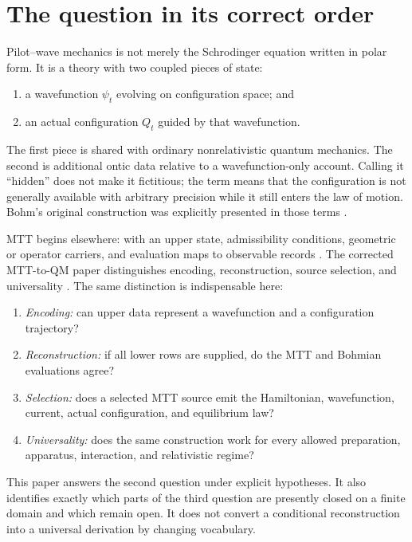 \documentclass[11pt]{article}
\theoremstyle{definition}
\theoremstyle{remark}
\let\MTToriginalitem\item
\renewcommand{\item}{\par\MTToriginalitem}
\begin{document}
\tableofcontents

\section{The question in its correct order}
\label{sec:question}

Pilot--wave mechanics is not merely the Schrodinger equation written in
polar form.  It is a theory with two coupled pieces of state:
\begin{enumerate}[leftmargin=2em]
\item a wavefunction \(\psi_t\) evolving on configuration space; and
\item an actual configuration \(Q_t\) guided by that wavefunction.
\end{enumerate}
The first piece is shared with ordinary nonrelativistic quantum mechanics.
The second is additional ontic data relative to a wavefunction-only account.
Calling it ``hidden'' does not make it fictitious; the term means that the
configuration is not generally available with arbitrary precision while it
still enters the law of motion.  Bohm's original construction was explicitly
presented in those terms \cite{Bohm1952I,Bohm1952II}.

MTT begins elsewhere: with an upper state, admissibility conditions,
geometric or operator carriers, and evaluation maps to observable records
\cite{MTTFoundation2026}.  The corrected MTT-to-QM paper distinguishes
encoding, reconstruction, source selection, and universality
\cite{MTTQM2026}.  The same distinction is indispensable here:
\begin{enumerate}[leftmargin=2em]
\item \emph{Encoding:} can upper data represent a wavefunction and a
      configuration trajectory?
\item \emph{Reconstruction:} if all lower rows are supplied, do the MTT and
      Bohmian evaluations agree?
\item \emph{Selection:} does a selected MTT source emit the Hamiltonian,
      wavefunction, current, actual configuration, and equilibrium law?
\item \emph{Universality:} does the same construction work for every
      allowed preparation, apparatus, interaction, and relativistic regime?
\end{enumerate}

This paper answers the second question under explicit hypotheses.  It also
identifies exactly which parts of the third question are presently closed
on a finite domain and which remain open.  It does not convert a conditional
reconstruction into a universal derivation by changing vocabulary.
\end{document}
